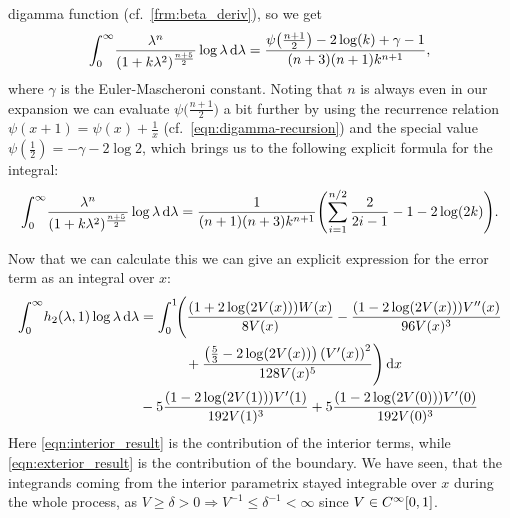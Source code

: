 digamma function (cf.\ \cref{frm:beta_deriv}), so we get
\begin{equation*}
  \Integ[\infty]{0}{\lambda}{
    \frac{\lambda^n}{(1 + k\lambda^2)^{\frac{n+5}{2}}}\log\lambda
  } =
      \frac{
        \psi\bigl(\frac{n+1}{2}\bigr) - 2\log(k) + \gamma - 1
      }{
           (n+3)(n+1)k^{n+1}
      },
\end{equation*}
where $\gamma$ is the Euler-Mascheroni constant. Noting that $n$ is always even
in our expansion we can evaluate $\psi\bigl(\tfrac{n+1}{2}\bigr)$ a bit further
by using the recurrence relation $\psi(x + 1) = \psi(x) + \tfrac{1}{x}$ (cf.\
\cref{eqn:digamma-recursion}) and the special value $\psi(\tfrac{1}{2}) =
-\gamma - 2\log 2$, which brings us to the following explicit formula for the
integral:
\begin{equation}
  \Integ[\infty]{0}{\lambda}{
    \frac{\lambda^n}{(1 + k \lambda^2)^{\frac{n+5}{2}}}
    \log\lambda
  } = \frac{1}{(n+1)(n+3)k^{n+1}}
  \Biggl( \sum_{i=1}^{n/2}\frac{2}{2i - 1} -1 - 2\log(2k) \Biggr).
\end{equation}

Now that we can calculate this we can give an explicit expression for the error
term as an integral over $x$:
\begin{align}
  \Integ[\infty]{0}{\lambda}{ h_2(\lambda, 1) \log\lambda }
  &=
  \label{eqn:interior_result}
  \Int{x}{\Biggl(\frac{(1 + 2 \log(2 V(x))) W(x)}{8 V(x)}
    - \frac{ (1 - 2 \log(2 V(x)))V''(x)}{96 V(x)^{3}} \\
    &\hphantom{=\int_0^1\Biggl(}\mathbin{+} \frac{\left(\frac{5}{3} - 2\log(2
    V(x))\right)\left(V'(x)\right)^{2}}{128 V(x)^{5}}\Biggr) } \nonumber \\
&\mathbin- 5\frac{(1 - 2\log(2 V(1)))V'(1)}{192 V(1)^3}
+ 5\frac{(1 - 2 \log(2 V(0)))V'(0)}{192 V(0)^3}
\label{eqn:exterior_result}
\end{align}
Here \eqref{eqn:interior_result} is the contribution of the interior terms,
while \eqref{eqn:exterior_result} is the contribution of the boundary. We have
seen, that the integrands coming from the interior parametrix stayed integrable
over $x$ during the whole process, as $V \geq \delta > 0 \Rightarrow V^{-1} \leq
\delta^{-1} < \infty$ since $V\in\Cinf{[0,1]}$.
